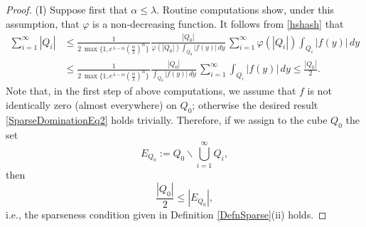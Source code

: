 \documentclass[11pt, a4paper,leqno]{amsart}
\theoremstyle{plain}
\numberwithin{equation}{section}
\theoremstyle{definition}
\theoremstyle{remark}
\begin{document}
\begin{proof}
(I) Suppose first that $\alpha\leq\lambda$. Routine computations show, under
this assumption, that $\varphi$ is a non-decreasing function. It follows from
\eqref{hshash} that
\begin{align*}
\sum_{i=1}^{\infty}|Q_{i}|  &  \leq\frac{1}{2\,\max \{1,e^{\lambda-\alpha
} (\frac{\alpha}{\lambda})^{\alpha} \}\,}\frac{|Q_{0}|}%
{\varphi(|Q_{0}|)\int_{Q_{0}}|f(y)|\,dy}\,\sum_{i=1}^{\infty}\varphi
(|Q_{i}|)\int_{Q_{i}}|f(y)|\,dy\\
&  \leq\frac{1}{2\,\max \{1,e^{\lambda-\alpha} (\frac{\alpha}{\lambda
})^{\alpha} \}\,}\frac{|Q_{0}|}{\int_{Q_{0}}|f(y)|\,dy}\,\sum_{i=1}^{\infty}\int_{Q_{i}}|f(y)|\,dy  \leq\frac{|Q_{0}|}{2}.
\end{align*}
Note that, in the first step of above computations, we assume that $f$ is not
identically zero (almost everywhere) on $Q_{0}$; otherwise the desired result
\eqref{SparseDominationEq2} holds trivially. Therefore, if we assign to the
cube $Q_{0}$ the set%
\begin{equation}
E_{Q_{0}}:=Q_{0}\backslash\bigcup_{i=1}^{\infty}Q_{i}, \label{EQDef}%
\end{equation}
then%
\begin{equation}
\frac{\left\vert Q_{0}\right\vert }{2}\leq|E_{Q_{0}}|, \label{laitera2}%
\end{equation}
i.e., the sparseness condition given in Definition \ref{DefnSparse}(ii) holds.


\end{proof}
\end{document}
